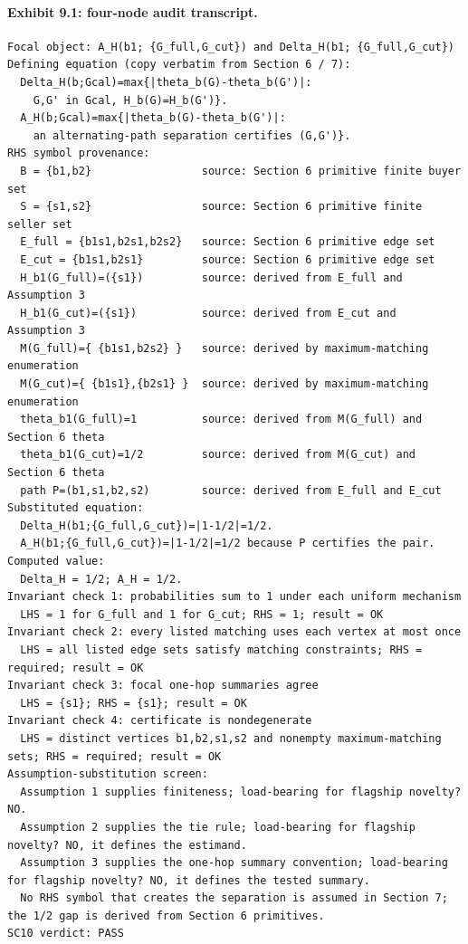 \documentclass[11pt]{article}
\theoremstyle{definition}
\theoremstyle{plain}
\theoremstyle{remark}
\begin{document}
\paragraph{Exhibit 9.1: four-node audit transcript.}
\begin{verbatim}
Focal object: A_H(b1; {G_full,G_cut}) and Delta_H(b1; {G_full,G_cut})
Defining equation (copy verbatim from Section 6 / 7):
  Delta_H(b;Gcal)=max{|theta_b(G)-theta_b(G')|:
    G,G' in Gcal, H_b(G)=H_b(G')}.
  A_H(b;Gcal)=max{|theta_b(G)-theta_b(G')|:
    an alternating-path separation certifies (G,G')}.
RHS symbol provenance:
  B = {b1,b2}                 source: Section 6 primitive finite buyer set
  S = {s1,s2}                 source: Section 6 primitive finite seller set
  E_full = {b1s1,b2s1,b2s2}   source: Section 6 primitive edge set
  E_cut = {b1s1,b2s1}         source: Section 6 primitive edge set
  H_b1(G_full)=({s1})         source: derived from E_full and Assumption 3
  H_b1(G_cut)=({s1})          source: derived from E_cut and Assumption 3
  M(G_full)={ {b1s1,b2s2} }   source: derived by maximum-matching enumeration
  M(G_cut)={ {b1s1},{b2s1} }  source: derived by maximum-matching enumeration
  theta_b1(G_full)=1          source: derived from M(G_full) and Section 6 theta
  theta_b1(G_cut)=1/2         source: derived from M(G_cut) and Section 6 theta
  path P=(b1,s1,b2,s2)        source: derived from E_full and E_cut
Substituted equation:
  Delta_H(b1;{G_full,G_cut})=|1-1/2|=1/2.
  A_H(b1;{G_full,G_cut})=|1-1/2|=1/2 because P certifies the pair.
Computed value:
  Delta_H = 1/2; A_H = 1/2.
Invariant check 1: probabilities sum to 1 under each uniform mechanism
  LHS = 1 for G_full and 1 for G_cut; RHS = 1; result = OK
Invariant check 2: every listed matching uses each vertex at most once
  LHS = all listed edge sets satisfy matching constraints; RHS = required; result = OK
Invariant check 3: focal one-hop summaries agree
  LHS = {s1}; RHS = {s1}; result = OK
Invariant check 4: certificate is nondegenerate
  LHS = distinct vertices b1,b2,s1,s2 and nonempty maximum-matching sets; RHS = required; result = OK
Assumption-substitution screen:
  Assumption 1 supplies finiteness; load-bearing for flagship novelty? NO.
  Assumption 2 supplies the tie rule; load-bearing for flagship novelty? NO, it defines the estimand.
  Assumption 3 supplies the one-hop summary convention; load-bearing for flagship novelty? NO, it defines the tested summary.
  No RHS symbol that creates the separation is assumed in Section 7; the 1/2 gap is derived from Section 6 primitives.
SC10 verdict: PASS
\end{verbatim}
\end{document}
